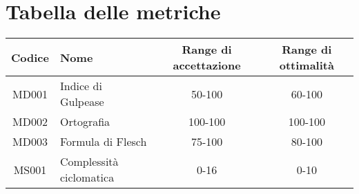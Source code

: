 \section{Tabella delle metriche}
\begin{center}
	\begin{tabularx}{\textwidth}{|c|X|c|c|}
		\hline
		\textbf{Codice} & \textbf{Nome} & \textbf{Range di accettazione} & \textbf{Range di ottimalità} \\
		\hline
		MD001 & Indice di Gulpease & 50-100 &60-100\\
		MD002 &Ortografia & 100-100 & 100-100\\
		MD003 &Formula di Flesch& 75-100 &80-100 \\
		\hline
		MS001 & Complessità ciclomatica & 0-16 & 0-10 \\
		
		
	\end{tabularx}
\end{center}